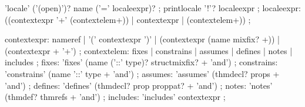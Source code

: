 
\begin{rail}
  'locale' ('(open)')? name ('=' localeexpr)?
  ;
  printlocale '!'? localeexpr
  ;
  localeexpr: ((contextexpr '+' (contextelem+)) | contextexpr | (contextelem+))
  ;

  contextexpr: nameref | '(' contextexpr ')' |
  (contextexpr (name mixfix? +)) | (contextexpr + '+')
  ;
  contextelem: fixes | constrains | assumes | defines | notes | includes
  ;
  fixes: 'fixes' (name ('::' type)? structmixfix? + 'and')
  ;
  constrains: 'constrains' (name '::' type + 'and')
  ;
  assumes: 'assumes' (thmdecl? props + 'and')
  ;
  defines: 'defines' (thmdecl? prop proppat? + 'and')
  ;
  notes: 'notes' (thmdef? thmrefs + 'and')
  ;
  includes: 'includes' contextexpr
  ;
\end{rail}

